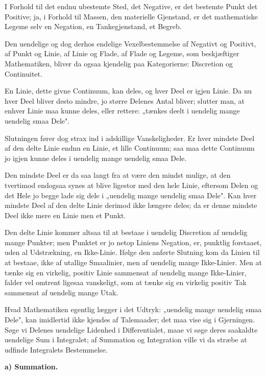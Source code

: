 \documentclass[12pt]{book}
\newcommand{\opage}[1]{\marginnote{\footnotesize\textit{[#1]}}}
\begin{document}
I Forhold til det endnu ubestemte Sted, det Negative, er det bestemte Punkt det
Positive; ja, i Forhold til Massen, den materielle Gjenstand, er det mathematiske
Legeme selv en Negation, en Tankegjenstand, et Begreb.

Den uendelige og dog derhos endelige Vexelbestemmelse af Negativt og Positivt, af
Punkt og Linie, af Linie og Flade, af Flade og Legeme, som beskjæftiger
Mathematiken, bliver da ogsaa kjendelig paa Kategorierne: Discretion og
Continuitet.

En Linie, dette givne Continuum, kan deles, og hver Deel er igjen Linie. Da nu hver
Deel bliver desto mindre, jo større Delenes Antal bliver; slutter man, at enhver
Linie maa kunne deles, eller rettere: „tænkes deelt i uendelig mange uendelig smaa
Dele".

Slutningen fører dog strax ind i adskillige Vanskeligheder. Er hver mindste Deel af
den delte Linie endnu en Linie, et lille Continuum; saa maa dette Continuum jo igjen
kunne deles i uendelig mange uendelig smaa Dele.

Den mindste Deel er da saa langt fra at være den mindst mulige, at den tvertimod
endogsaa synes at blive ligestor med den hele Linie, eftersom Delen og det Hele jo
begge lade sig dele i „uendelig mange uendelig smaa Dele". Kan hver mindste Deel af
den delte Linie derimod ikke længere deles; da er denne mindste Deel ikke mere en
Linie men et Punkt.

Den delte Linie kommer altsaa til at bestaae i uendelig Discretion af uendelig mange
Punkter; men Punktet er jo netop Liniens Negation, er, punktlig forstaaet, uden al
Udstrækning, en Ikke-Linie. Ifølge den anførte Slutning kom da Linien til at
bestaae, ikke af utallige Smaalinier, men af uendelig mange Ikke-Linier. Men at
tænke sig en virkelig, positiv Linie sammensat af uendelig mange Ikke-Linier, falder
vel omtrent ligesaa vanskeligt, som at tænke
\opage{67} sig en virkelig positiv Tak sammensat af uendelig mange Utak.

Hvad Mathematiken egentlig lægger i det Udtryk: „uendelig mange uendelig smaa
Dele", kan imidlertid ikke kjendes af Talemaader; det maa vise sig i Gjerningen.
Søge vi Delenes uendelige Lidenhed i Differentialet, maae vi søge deres saakaldte
uendelige Sum i Integralet; af Summation og Integration ville vi da stræbe at
udfinde Integralets Bestemmelse.

\begin{center}
\textbf{a) Summation.}
\end{center}
{}
\end{document}
